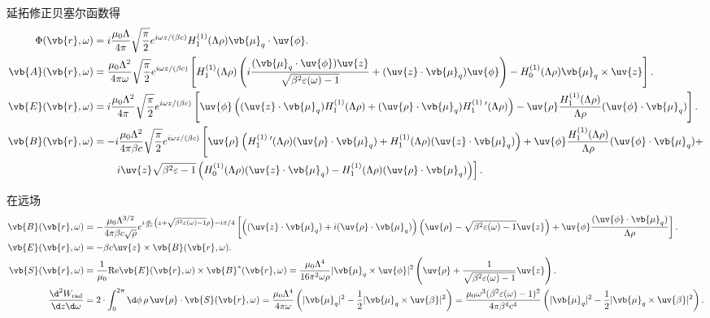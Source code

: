 \begin{example}
	延拓修正贝塞尔函数得
	\begin{align*}
		\Phi(\vb{r}, \omega) &= i \frac{\mu_{0} \Lambda}{4\pi} \sqrt{\frac{\pi}{2}} e^{i\omega z/(\beta c)} H_{1}^{(1)}(\Lambda \rho) \vb{\mu}_{q} \cdot \uv{\phi}. \\
		\vb{A}(\vb{r}, \omega) &= \frac{\mu_{0} \Lambda^{2}}{4\pi \omega} \sqrt{\frac{\pi}{2}} e^{i\omega z/(\beta c)} \left[ H_{1}^{(1)}(\Lambda \rho) \left( i \frac{(\vb{\mu}_{q} \cdot \uv{\phi}) \uv{z}}{\sqrt{\beta^{2} \varepsilon(\omega) - 1}} + (\uv{z} \cdot \vb{\mu}_{q}) \uv{\phi} \right) - H_{0}^{(1)}(\Lambda \rho) \vb{\mu}_{q} \times \uv{z} \right]. \\
		\vb{E}(\vb{r}, \omega) &= i \frac{\mu_{0} \Lambda^{2}}{4\pi} \sqrt{\frac{\pi}{2}} e^{i\omega z/(\beta c)} \left[ \uv{\phi} \left( (\uv{z} \cdot \vb{\mu}_{q}) H_{1}^{(1)}(\Lambda \rho) + (\uv{\rho} \cdot \vb{\mu}_{q}) H_{1}^{(1)}\,'(\Lambda \rho) \right) - \uv{\rho} \frac{H_{1}^{(1)}(\Lambda \rho)}{\Lambda \rho} (\uv{\phi} \cdot \vb{\mu}_{q}) \right]. \\
		\vb{B}(\vb{r}, \omega) &= -i \frac{\mu_{0} \Lambda^{2}}{4\pi \beta c} \sqrt{\frac{\pi}{2}} e^{i\omega z/(\beta c)} \left[ \uv{\rho} \left( H_{1}^{(1)}\,'(\Lambda \rho) (\uv{\rho} \cdot \vb{\mu}_{q}) + H_{1}^{(1)}(\Lambda \rho) (\uv{z} \cdot \vb{\mu}_{q}) \right) + \uv{\phi} \frac{H_{1}^{(1)}(\Lambda \rho)}{\Lambda \rho} (\uv{\phi} \cdot \vb{\mu}_{q}) +\right.\\&\qquad\left. i \uv{z} \sqrt{\beta^{2} \varepsilon - 1} \left( H_{0}^{(1)}(\Lambda \rho) (\uv{z} \cdot \vb{\mu}_{q}) - H_{1}^{(1)}(\Lambda \rho) (\uv{\rho} \cdot \vb{\mu}_{q}) \right) \right].
	\end{align*}

	在远场
	\begin{align*}
		\vb{B}(\vb{r}, \omega) &= -\frac{\mu_{0} \Lambda^{3/2}}{4\pi \beta c \sqrt{\rho}} e^{i\frac{\omega}{\beta c} \left( z + \sqrt{\beta^{2} \varepsilon(\omega) - 1} \rho \right) - i\pi/4} \left[ \left( (\uv{z} \cdot \vb{\mu}_{q}) + i (\uv{\rho} \cdot \vb{\mu}_{q}) \right) \left( \uv{\rho} - \sqrt{\beta^{2} \varepsilon(\omega) - 1} \uv{z} \right) + \uv{\phi} \frac{(\uv{\phi} \cdot \vb{\mu}_{q})}{\Lambda \rho} \right]. \\
		\vb{E}(\vb{r}, \omega) &= -\beta c \uv{z} \times \vb{B}(\vb{r}, \omega). \\
		\vb{S}(\vb{r}, \omega) &= \frac{1}{\mu_{0}} \mathrm{Re} \vb{E}(\vb{r}, \omega) \times \vb{B}^{*}(\vb{r}, \omega) = \frac{\mu_{0} \Lambda^{4}}{16\pi^{2} \omega \rho} | \vb{\mu}_{q} \times \uv{\phi} |^{2} \left( \uv{\rho} + \frac{1}{\sqrt{\beta^{2} \varepsilon(\omega) - 1}} \uv{z} \right). \\
		\frac{\d^{2} W_{\mathrm{rad}}}{\d z \d \omega} &= 2 \cdot \int_{0}^{2\pi} \d \phi \, \rho \, \uv{\rho} \cdot \vb{S}(\vb{r}, \omega) = \frac{\mu_{0} \Lambda^{4}}{4\pi \omega} \left( | \vb{\mu}_{q} |^{2} - \frac{1}{2} | \vb{\mu}_{q} \times \uv{\beta} |^{2} \right) = \frac{\mu_{0} \omega^{3} (\beta^{2} \varepsilon(\omega) - 1)^{2}}{4\pi \beta^{4} c^{4}} \left( | \vb{\mu}_{q} |^{2} - \frac{1}{2} | \vb{\mu}_{q} \times \uv{\beta} |^{2} \right).
	\end{align*}


\end{example}
